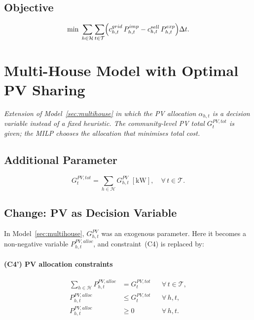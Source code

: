 \documentclass{article}
\begin{document}
\subsection{Objective}
\begin{equation}
  \min \;\sum_{h \in \mathcal{H}}\sum_{t \in \mathcal{T}}
  \Bigl(c^{grid}_{h,t}\,P^{imp}_{h,t} - c^{sell}_{h,t}\,P^{exp}_{h,t}\Bigr)\Delta t.
  \label{eq:OBJ_mh}
\end{equation}

\newpage
\section{Multi-House Model with Optimal PV Sharing}
\label{sec:sharing}

\textit{Extension of Model~\ref{sec:multihouse} in which the PV allocation
$\alpha_{h,t}$ is a decision variable instead of a fixed heuristic.
The community-level PV total $G^{PV,tot}_t$ is given; the MILP chooses the
allocation that minimises total cost.}

\subsection{Additional Parameter}
\[
  G^{PV,tot}_t = \sum_{h \in \mathcal{H}} G^{PV}_{h,t}
  \;[\mathrm{kW}],
  \quad \forall\,t \in \mathcal{T}.
\]

\subsection{Change: PV as Decision Variable}

In Model~\ref{sec:multihouse}, $G^{PV}_{h,t}$ was an exogenous parameter.
Here it becomes a non-negative variable $P^{PV,alloc}_{h,t}$, and
constraint~(C4) is replaced by:

\paragraph{(C4') PV allocation constraints}
\begin{align}
  \sum_{h \in \mathcal{H}} P^{PV,alloc}_{h,t}
    &= G^{PV,tot}_t                 && \forall\,t \in \mathcal{T}, \label{eq:alpha_sum} \\
  P^{PV,alloc}_{h,t}
    &\le G^{PV,tot}_t               && \forall\,h,t, \label{eq:alpha_bound} \\
  P^{PV,alloc}_{h,t}
    &\ge 0                          && \forall\,h,t. \label{eq:alpha_nonneg}
\end{align}
\end{document}
